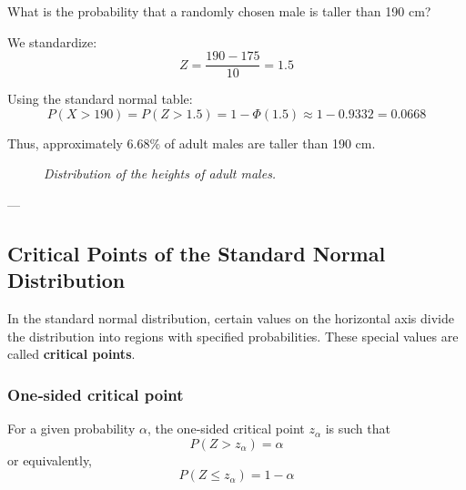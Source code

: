 \documentclass[twoside]{book}
\begin{document}
What is the probability that a randomly chosen male is taller than 190 cm?

We standardize:
\[
Z = \frac{190 - 175}{10} = 1.5
\]

Using the standard normal table:
\[
P(X > 190) = P(Z > 1.5) = 1 - \Phi(1.5) \approx 1 - 0.9332 = 0.0668
\]

Thus, approximately $6.68\%$ of adult males are taller than 190 cm.

\begin{figure}[H]
  \centering
  \caption{\textit{Distribution of the heights of adult males.}}
\end{figure}

---

\subsection{Critical Points of the Standard Normal Distribution}

In the standard normal distribution, certain values on the horizontal axis divide the distribution into regions with specified probabilities. These special values are called \textbf{critical points}.

\subsubsection{One‐sided critical point}
For a given probability \(\alpha\), the one‐sided critical point $z_{\alpha}$ is such that
\[
P(Z > z_{\alpha}) = \alpha
\]
or equivalently, \[P(Z \le z_{\alpha}) = 1 - \alpha\]
\end{document}
